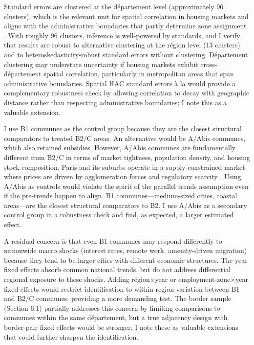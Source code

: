 \documentclass[12pt]{article}
\begin{document}
Standard errors are clustered at the d\'{e}partement level (approximately 96 clusters), which is the relevant unit for spatial correlation in housing markets and aligns with the administrative boundaries that partly determine zone assignment \citep{bertrand2004}. With roughly 96 clusters, inference is well-powered by \citet{callaway2021} standards, and I verify that results are robust to alternative clustering at the r\'{e}gion level (13 clusters) and to heteroskedasticity-robust standard errors without clustering. D\'{e}partement clustering may understate uncertainty if housing markets exhibit cross-d\'{e}partement spatial correlation, particularly in metropolitan areas that span administrative boundaries. Spatial HAC standard errors \`{a} la \citet{conley1999} would provide a complementary robustness check by allowing correlation to decay with geographic distance rather than respecting administrative boundaries; I note this as a valuable extension.

I use B1 communes as the control group because they are the closest structural comparators to treated B2/C areas. An alternative would be A/Abis communes, which also retained subsidies. However, A/Abis communes are fundamentally different from B2/C in terms of market tightness, population density, and housing stock composition. Paris and its suburbs operate in a supply-constrained market where prices are driven by agglomeration forces and regulatory scarcity \citep{combes2018, glaeser2005}. Using A/Abis as controls would violate the spirit of the parallel trends assumption even if the pre-trends happen to align. B1 communes---medium-sized cities, coastal areas---are the closest structural comparators to B2. I use A/Abis as a secondary control group in a robustness check and find, as expected, a larger estimated effect.

A residual concern is that even B1 communes may respond differently to nationwide macro shocks (interest rates, remote work, amenity-driven migration) because they tend to be larger cities with different economic structures. The year fixed effects absorb common national trends, but do not address differential regional exposure to these shocks. Adding r\'{e}gion$\times$year or employment-zone$\times$year fixed effects would restrict identification to within-region variation between B1 and B2/C communes, providing a more demanding test. The border sample (Section 6.1) partially addresses this concern by limiting comparisons to communes within the same d\'{e}partement, but a true adjacency design with border-pair fixed effects would be stronger. I note these as valuable extensions that could further sharpen the identification.
\end{document}
